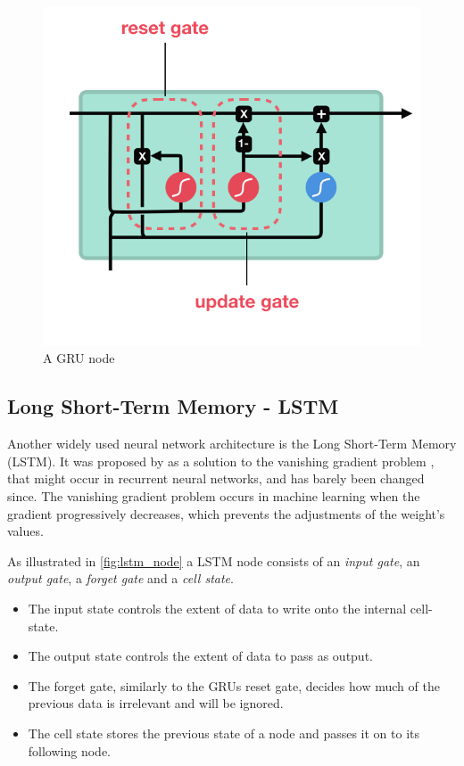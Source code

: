 \documentclass[nofilelist]{cslthse-msc}
\begin{document}
\begin{figure}[h!]
    \centering
    \includegraphics[scale=0.4]{msccls/explanatory_images/gru.png}
    \caption{A GRU node}
    \label{fig:gru_node}
\end{figure}

\subsection{Long Short-Term Memory - LSTM}
Another widely used neural network architecture is the Long Short-Term Memory (LSTM). It was proposed by \citet{hochreiter1997} as a solution to the vanishing gradient problem \citep{hochreiter1998}, that might occur in recurrent neural networks, and has barely been changed since. The vanishing gradient problem occurs in machine learning when the gradient progressively decreases, which prevents the adjustments of the weight's values. 

As illustrated in \ref{fig:lstm_node} a LSTM node consists of an \textit{input gate}, an \textit{output gate}, a \textit{forget gate} and a \textit{cell state}. 
\begin{itemize}
    \item The input state controls the extent of data to write onto the internal cell-state.
    \item The output state controls the extent of data to pass as output. 
    \item The forget gate, similarly to the GRUs reset gate, decides how much of the previous data is irrelevant and will be ignored. 
    \item The cell state stores the previous state of a node and passes it on to its following node. 
\end{itemize}
\end{document}
